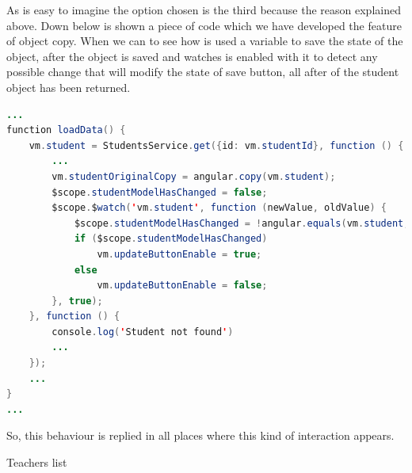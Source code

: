 \noindent As is easy to imagine the option chosen is the third because the reason explained
above. Down below is shown a piece of code which we have developed the feature of object copy.
When we can to see how is used a variable to save the state of the object, after
the object is saved and watches is enabled with it to detect any possible change
that will modify the state of save button, all after of the student object has been returned.

\begin{lstlisting}[language=java,frame=none, title=studentProfile.js]
...
function loadData() {
    vm.student = StudentsService.get({id: vm.studentId}, function () {
        ...
        vm.studentOriginalCopy = angular.copy(vm.student);
        $scope.studentModelHasChanged = false;
        $scope.$watch('vm.student', function (newValue, oldValue) {
            $scope.studentModelHasChanged = !angular.equals(vm.student, vm.studentOriginalCopy);
            if ($scope.studentModelHasChanged)
                vm.updateButtonEnable = true;
            else
                vm.updateButtonEnable = false;
        }, true);
    }, function () {
        console.log('Student not found')
        ...
    });
    ...
}
...
\end{lstlisting}

\noindent So, this behaviour is replied in all places where this kind of interaction appears.



%

\noindent Teachers list

